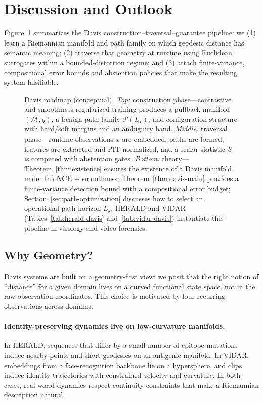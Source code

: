 \documentclass[11pt]{article}
\begin{document}
\section{Discussion and Outlook}
\label{sec:discussion}

Figure~\ref{fig:davis-roadmap} summarizes the Davis construction--traversal--guarantee pipeline: we
(1) learn a Riemannian manifold and path family on which geodesic distance has semantic meaning;
(2) traverse that geometry at runtime using Euclidean surrogates within a bounded-distortion regime;
and (3) attach finite-variance, compositional error bounds and abstention policies that make the
resulting system falsifiable.

\begin{figure}[t]
  \centering
  \caption{Davis roadmap (conceptual). \emph{Top:} construction phase---contrastive and
  smoothness-regularized training produces a pullback manifold $(\mathcal{M},g)$, a benign path family
  $\mathcal{P}(L_\star)$, and configuration structure with hard/soft margins and an ambiguity band.
  \emph{Middle:} traversal phase---runtime observations $x$ are embedded, paths are formed, features
  are extracted and PIT-normalized, and a scalar statistic $S$ is computed with abstention gates.
  \emph{Bottom:} theory---Theorem~\ref{thm:existence} ensures the existence of a Davis manifold
  under InfoNCE + smoothness; Theorem~\ref{thm:davis-main} provides a finite-variance detection
  bound with a compositional error budget; Section~\ref{sec:path-optimization} discusses how to
  select an operational path horizon $L_\star$. HERALD and VIDAR (Tables~\ref{tab:herald-davis} and~\ref{tab:vidar-davis}) instantiate this pipeline in virology and video forensics.}
  \label{fig:davis-roadmap}
\end{figure}

\subsection{Why Geometry?}

Davis systems are built on a geometry-first view: we posit that the right notion of ``distance'' for a
given domain lives on a curved functional state space, not in the raw observation coordinates. This
choice is motivated by four recurring observations across domains.

\paragraph{Identity-preserving dynamics live on low-curvature manifolds.}
In HERALD, sequences that differ by a small number of epitope mutations induce nearby points
and short geodesics on an antigenic manifold. In VIDAR, embeddings from a face-recognition
backbone lie on a hypersphere, and clips induce identity trajectories with constrained velocity and
curvature. In both cases, real-world dynamics respect continuity constraints that make a
Riemannian description natural.
\end{document}
